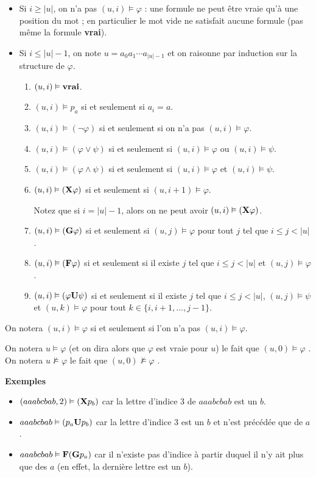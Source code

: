 \begin{itemize}
\item Si $i \ge |u|$, on n’a pas $(u, i) \vDash \varphi$ : une formule ne peut être
vraie qu’à une position du mot ; en particulier le mot vide ne satisfait aucune formule (pas même la formule {\bf vrai}).
\item Si $i \le |u| - 1$, on note $u=a_0a_1\cdots a_{|u|-1}$ et on raisonne par induction sur la structure de $\varphi$.
\begin{enumerate}
    \item $(u, i) \vDash {\bf vrai}$.
    \item $(u, i) \vDash p_a$ si et seulement si $a_i=a$.
    \item $(u, i) \vDash (\neg \varphi)$ si et seulement si on n’a pas $(u, i) \vDash \varphi$.
    \item $(u, i) \vDash (\varphi \vee \psi)$ si et seulement si $(u, i) \vDash \varphi$ ou $(u, i) \vDash \psi$.
    \item $(u, i) \vDash (\varphi \wedge \psi)$ si et seulement si $(u, i) \vDash \varphi$ et $(u, i) \vDash \psi$.
    \item $(u, i) \vDash ({\bf X} \varphi)$ si et seulement si $(u, i+1) \vDash \varphi$. 
    
    Notez que si $i = |u| - 1$, alors on ne peut avoir $(u, i) \vDash ({\bf X} \varphi)$.
    \item $(u, i) \vDash ({\bf G} \varphi)$ si et seulement si $(u, j) \vDash \varphi$ pour tout $j$ tel que $i\le j < |u|$.
    \item $(u, i) \vDash ({\bf F} \varphi)$ si et seulement si il existe $j$ tel que $i\le j < |u|$ et $(u, j) \vDash \varphi$.
    \item $(u, i) \vDash (\varphi {\bf U} \psi)$ si et seulement si il existe $j$ tel que $i\le j < |u|$, $(u, j) \vDash \psi$ et $(u, k) \vDash \varphi$ pour tout $k\in\{i, i+1, \ldots, j-1\}$.
\end{enumerate}
\end{itemize}

On notera $(u, i) \vDash \varphi$ si et seulement si l’on n’a pas $(u, i) \vDash \varphi$. 

On notera $u \vDash \varphi$  (et on dira alors que $\varphi$ est vraie pour $u$) le fait que $(u, 0) \vDash \varphi$ .
On notera $u \nvDash \varphi$  le fait que $(u, 0) \nvDash \varphi$ .

{\bf Exemples}
\begin{itemize}
    \item $(aaabcbab, 2) \vDash ({\bf X} p_b)$ car la lettre d’indice 3 de $aaabcbab$ est un $b$.
    \item $aaabcbab \vDash (p_a{\bf U} p_b)$ car la lettre d’indice 3 est un $b$ et n'est précédée que de $a$.
    \item $aaabcbab \vDash {\bf F}({\bf G} p_a)$ car il n’existe pas d’indice à partir duquel il n’y ait plus que des $a$ (en effet, la dernière lettre est un $b$).
\end{itemize}

